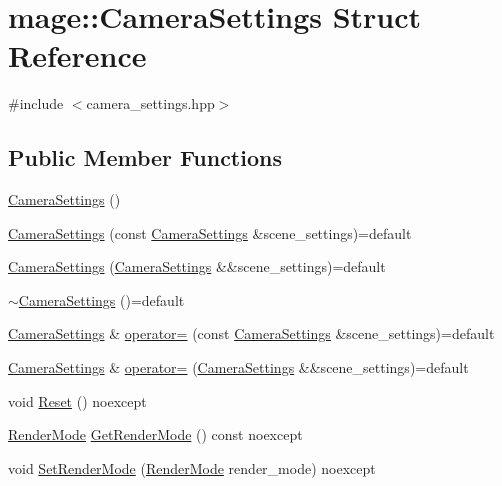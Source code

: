 \hypertarget{structmage_1_1_camera_settings}{}\section{mage\+:\+:Camera\+Settings Struct Reference}
\label{structmage_1_1_camera_settings}


{\ttfamily \#include $<$camera\+\_\+settings.\+hpp$>$}

\subsection*{Public Member Functions}
\begin{DoxyCompactItemize}
\item 
\hyperlink{structmage_1_1_camera_settings_a08e24d87d4441af780a3f34504a41118}{Camera\+Settings} ()
\item 
\hyperlink{structmage_1_1_camera_settings_a9dc529822866523b62b7d9388e04c5fd}{Camera\+Settings} (const \hyperlink{structmage_1_1_camera_settings}{Camera\+Settings} \&scene\+\_\+settings)=default
\item 
\hyperlink{structmage_1_1_camera_settings_a006a0cb2758137b14c65c4788f25d41e}{Camera\+Settings} (\hyperlink{structmage_1_1_camera_settings}{Camera\+Settings} \&\&scene\+\_\+settings)=default
\item 
\hyperlink{structmage_1_1_camera_settings_a738a93dc2e1aed2cac7a58af658984f3}{$\sim$\+Camera\+Settings} ()=default
\item 
\hyperlink{structmage_1_1_camera_settings}{Camera\+Settings} \& \hyperlink{structmage_1_1_camera_settings_aaabd402e2e9510d0e44ec31320baff87}{operator=} (const \hyperlink{structmage_1_1_camera_settings}{Camera\+Settings} \&scene\+\_\+settings)=default
\item 
\hyperlink{structmage_1_1_camera_settings}{Camera\+Settings} \& \hyperlink{structmage_1_1_camera_settings_a5104072c8c15e8dfc0b9459a537afe5e}{operator=} (\hyperlink{structmage_1_1_camera_settings}{Camera\+Settings} \&\&scene\+\_\+settings)=default
\item 
void \hyperlink{structmage_1_1_camera_settings_a4894cae6954c111339be554e8dd9562c}{Reset} () noexcept
\item 
\hyperlink{namespacemage_a5e7e18b0154373ce8fc942fe3f6b27fd}{Render\+Mode} \hyperlink{structmage_1_1_camera_settings_a6673291bcfed8fa2c0a0041bf8f97f24}{Get\+Render\+Mode} () const noexcept
\item 
void \hyperlink{structmage_1_1_camera_settings_ab0d6720a08e88e018c2a2e6097933d98}{Set\+Render\+Mode} (\hyperlink{namespacemage_a5e7e18b0154373ce8fc942fe3f6b27fd}{Render\+Mode} render\+\_\+mode) noexcept

\end{DoxyCompactItemize}
